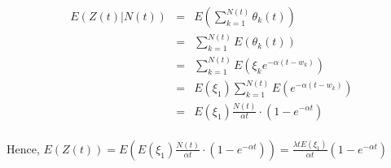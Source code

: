 \documentclass[10pt,a4paper]{article}
\begin{document}
\begin{flushleft}
\begin{eqnarray*}
E(Z(t)|N(t))&=& E(\sum_{k=1}^{N(t)} \theta_k (t)) \\
&=& \sum_{k=1}^{N(t)} E(\theta_k (t)) \\
&=& \sum_{k=1}^{N(t)} E(\xi_k e^{-\alpha (t-w_k)}) \\
&=& E(\xi_1) \sum_{k=1}^{N(t)} E(e^{-\alpha (t-w_k)}) \\
&=& E(\xi_1) \frac{N(t)}{\alpha t} \cdot (1-e^{-\alpha t}) \\
\end{eqnarray*}

Hence, $E(Z(t))=E( E(\xi_1) \frac{N(t)}{\alpha t} \cdot
(1-e^{-\alpha t}) )=\frac{\lambda t E(\xi_1)}{\alpha t}
(1-e^{-\alpha t}) $

\begin{eqnarray*}
\\
\end{eqnarray*}

\end{flushleft}
\end{document}

